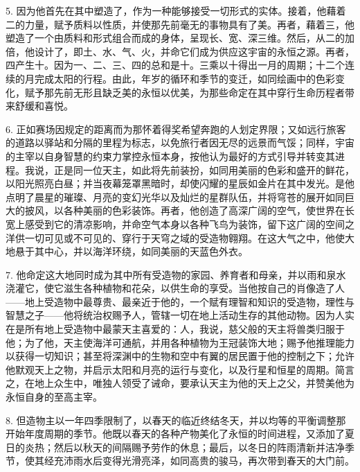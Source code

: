 5. 因为他首先在其中塑造了，作为一种能够接受一切形式的实体。接着，他藉着二的力量，赋予质料以性质，并使那先前毫无的事物具有了美。再者，藉着三，他塑造了一个由质料和形式组合而成的身体，呈现长、宽、深三维。然后，从二的加倍，他设计了，即土、水、气、火，并命它们成为供应这宇宙的永恒之源。再者，四产生十。因为一、二、三、四的总和是十。三乘以十得出一月的周期；十二个连续的月完成太阳的行程。由此，年岁的循环和季节的变迁，如同绘画中的色彩变化，赋予那先前无形且缺乏美的永恒以优美，为那些命定在其中穿行生命历程者带来舒缓和喜悦。\par

6. 正如赛场因规定的距离而为那怀着得奖希望奔跑的人划定界限；又如远行旅客的道路以驿站和分隔的里程为标志，以免旅行者因无尽的远景而气馁；同样，宇宙的主宰以自身智慧的约束力掌控永恒本身，按他认为最好的方式引导并转变其进程。我说，正是同一位天主，如此将先前装扮，如同用美丽的色彩和盛开的鲜花，以阳光照亮白昼；并当夜幕笼罩黑暗时，却使闪耀的星辰如金片在其中发光。是他点明了晨星的璀璨、月亮的变幻光华以及灿烂的星群队伍，并将穹苍的展开如同巨大的披风，以各种美丽的色彩装饰。再者，他创造了高深广阔的空气，使世界在长宽上感受到它的清凉影响，并命空气本身以各种飞鸟为装饰，留下这广阔的空间之洋供一切可见或不可见的、穿行于天穹之域的受造物翱翔。在这大气之中，他使大地悬于其中心，并以海洋环绕，如同美丽的天蓝色外衣。\par

7. 他命定这大地同时成为其中所有受造物的家园、养育者和母亲，并以雨和泉水浇灌它，使它滋生各种植物和花朵，以供生命的享受。当他按自己的肖像造了人——地上受造物中最尊贵、最亲近于他的，一个赋有理智和知识的受造物，理性与智慧之子——他将统治权赐予人，管辖一切在地上活动生存的其他动物。因为人实在是所有地上受造物中最蒙天主喜爱的：人，我说，慈父般的天主将兽类归服于他；为了他，天主使海洋可通航，并用各种植物为王冠装饰大地；赐予他推理能力以获得一切知识；甚至将深渊中的生物和空中有翼的居民置于他的控制之下；允许他默观天上之物，并启示太阳和月亮的运行与变化，以及行星和恒星的周期。简言之，在地上众生中，唯独人领受了诫命，要承认天主为他的天上之父，并赞美他为永恒自身的至高主宰。\par

8. 但造物主以一年四季限制了，以春天的临近终结冬天，并以均等的平衡调整那开始年度周期的季节。他既以春天的各种产物美化了永恒的时间进程，又添加了夏日的炎热；然后以秋天的间隔赐予劳作的休息；最后，以冬日的阵雨清新并洁净季节，使其经充沛雨水后变得光滑亮泽，如同高贵的骏马，再次带到春天的大门前。\par

